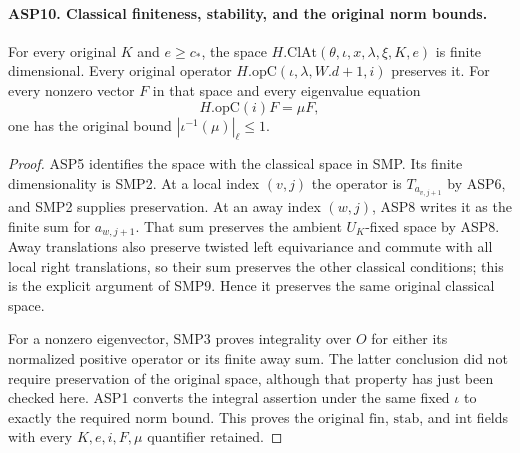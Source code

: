 \paragraph{ASP10. Classical finiteness, stability, and the original norm bounds.}
\label{claim:ASP10}
For every original $K$ and $e\geq c_*$, the
space $H.\mathrm{ClAt}(\theta,\iota,x,\lambda,\xi,K,e)$
is finite dimensional.  Every original operator
$H.\mathrm{opC}(\iota,\lambda,W.d+1,i)$ preserves it.
For every nonzero vector $F$ in that space and
every eigenvalue equation
\[
             H.\mathrm{opC}(i)F=\mu F,
\]
one has the original bound $|\iota^{-1}(\mu)|_\ell\leq1$.
\begin{proof}
ASP5 identifies the space with the classical
space in SMP.  Its finite dimensionality is
SMP2.  At a local index $(v,j)$ the operator
is $T_{a_{v,j+1}}$ by ASP6, and SMP2 supplies
preservation.  At an away index $(w,j)$,
ASP8 writes it as the finite sum for
$a_{w,j+1}$.  That sum preserves the ambient
$U_K$-fixed space by ASP8.  Away translations
also preserve twisted left equivariance and
commute with all local right translations,
so their sum preserves the other classical
conditions; this is the explicit argument of
SMP9.  Hence it preserves the same original
classical space.

For a nonzero eigenvector, SMP3 proves
integrality over $O$ for either its normalized
positive operator or its finite away sum.
The latter conclusion did not require
preservation of the original space, although
that property has just been checked here.
ASP1 converts the integral assertion under
the same fixed $\iota$ to exactly the required
norm bound.  This proves the original
$\mathrm{fin}$, $\mathrm{stab}$, and
$\mathrm{int}$ fields with every $K,e,i,F,\mu$
quantifier retained.
\end{proof}

